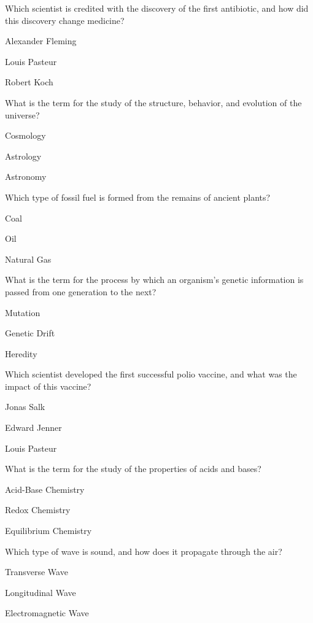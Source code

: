 \begin{enhancedmcq}{Which scientist is credited with the discovery of the first antibiotic, and how did this discovery change medicine?}
\item Alexander Fleming
\item Louis Pasteur
\item Robert Koch

\end{enhancedmcq}
\begin{enhancedmcq}{What is the term for the study of the structure, behavior, and evolution of the universe?}
\item Cosmology
\item Astrology
\item Astronomy

\end{enhancedmcq}
\begin{enhancedmcq}{Which type of fossil fuel is formed from the remains of ancient plants?}
\item Coal
\item Oil
\item Natural Gas

\end{enhancedmcq}
\begin{enhancedmcq}{What is the term for the process by which an organism's genetic information is passed from one generation to the next?}
\item Mutation
\item Genetic Drift
\item Heredity

\end{enhancedmcq}
\begin{enhancedmcq}{Which scientist developed the first successful polio vaccine, and what was the impact of this vaccine?}
\item Jonas Salk
\item Edward Jenner
\item Louis Pasteur

\end{enhancedmcq}
\begin{enhancedmcq}{What is the term for the study of the properties of acids and bases?}
\item Acid-Base Chemistry
\item Redox Chemistry
\item Equilibrium Chemistry

\end{enhancedmcq}
\begin{enhancedmcq}{Which type of wave is sound, and how does it propagate through the air?}
\item Transverse Wave
\item Longitudinal Wave
\item Electromagnetic Wave

\end{enhancedmcq}
